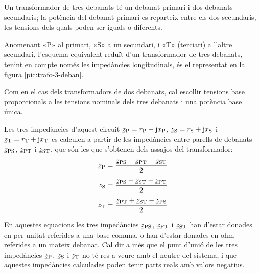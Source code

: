 Un transformador de tres debanats té un debanat primari i dos debanats secundaris; la potència del debanat primari es reparteix entre els dos secundaris, les tensions dels quals poden ser iguals o diferents.

Anomenant «P» al primari, «S» a un secundari, i «T» (terciari) a l'altre secundari, l'esquema equivalent reduït d'un transformador de tres debanats, tenint en compte només les impedàncies longitudinals,  és el representat en la figura \vref{pic:trafo-3-deban}.

\begin{center}
    
    \label{pic:trafo-3-deban}
\end{center}

Com en el cas dels transformadors de dos debanats, cal escollir tensions base proporcionals a les tensions nominals dels tres debanats i una potència base única.

Les tres impedàncies d'aquest circuit $\cmplx{z}\ped{P} = r\ped{P} + \ju x\ped{P}$, $\cmplx{z}\ped{S} = r\ped{S} + \ju x\ped{S}$ i $\cmplx{z}\ped{T} = r\ped{T} + \ju x\ped{T}$ es calculen a partir de les impedàncies entre parells de debanats $\cmplx{z}\ped{PS}$, $\cmplx{z}\ped{PT}$ i $\cmplx{z}\ped{ST}$, que són les que s'obtenen dels assajos del transformador:
\begin{subequations}
\begin{align}
    \cmplx{z}\ped{P} &= \frac{\cmplx{z}\ped{PS}+\cmplx{z}\ped{PT}-\cmplx{z}\ped{ST}}{2}  \\[1ex]
    \cmplx{z}\ped{S} &= \frac{\cmplx{z}\ped{PS}+\cmplx{z}\ped{ST}-\cmplx{z}\ped{PT}}{2}  \\[1ex]
    \cmplx{z}\ped{T} &= \frac{\cmplx{z}\ped{PT}+\cmplx{z}\ped{ST}-\cmplx{z}\ped{PS}}{2}
\end{align}
\end{subequations}

En aquestes equacions  les tres impedàncies $\cmplx{z}\ped{PS}$, $\cmplx{z}\ped{PT}$ i $\cmplx{z}\ped{ST}$ han d'estar donades en per unitat referides a una base comuna, o han d'estar donades en ohm referides a un mateix debanat. Cal dir a més que el punt d'unió de les tres impedàncies $\cmplx{z}\ped{P}$, $\cmplx{z}\ped{S}$ i $\cmplx{z}\ped{T}$ no té res a veure amb el neutre del sistema, i que aquestes impedàncies calculades poden tenir parts reals amb valors  negatius.


